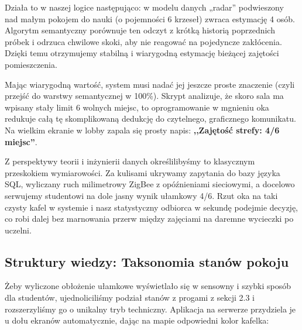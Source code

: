 \documentclass[14pt,a4paper]{extarticle}
\begin{document}
Działa to w naszej logice następująco: w modelu danych „radar” podwieszony nad małym pokojem do nauki (o pojemności 6 krzeseł) zwraca estymację 4 osób. Algorytm semantyczny porównuje ten odczyt z krótką historią poprzednich próbek i odrzuca chwilowe skoki, aby nie reagować na pojedyncze zakłócenia. Dzięki temu otrzymujemy stabilną i wiarygodną estymację bieżącej zajętości pomieszczenia.

Mając wiarygodną wartość, system musi nadać jej jeszcze proste znaczenie (czyli przejść do warstwy semantycznej w 100\%). Skrypt analizuje, że skoro sala ma wpisany stały limit 6 wolnych miejsc, to oprogramowanie w mgnieniu oka redukuje całą tę skomplikowaną dedukcję do czytelnego, graficznego komunikatu. Na wielkim ekranie w lobby zapala się prosty napis: \textbf{,,Zajętość strefy: 4/6 miejsc''}.

Z perspektywy teorii i inżynierii danych określilibyśmy to klasycznym przeskokiem wymiarowości. Za kulisami ukrywamy zapytania do bazy języka SQL, wyliczany ruch milimetrowy ZigBee z opóźnieniami sieciowymi, a docelowo serwujemy studentowi na dole jasny wynik ułamkowy 4/6. Rzut oka na taki czysty kafel w systemie i nasz statystyczny odbiorca w sekundę podejmie decyzję, co robi dalej bez marnowania przerw między zajęciami na daremne wycieczki po uczelni.

\subsection{Struktury wiedzy: Taksonomia stanów pokoju}

Żeby wyliczone obłożenie ułamkowe wyświetlało się w sensowny i szybki sposób dla studentów, ujednoliciliśmy podział stanów z progami z sekcji 2.3 i rozszerzyliśmy go o unikalny tryb techniczny. Aplikacja na serwerze przydziela je u dołu ekranów automatycznie, dając na mapie odpowiedni kolor kafelka:
\end{document}
